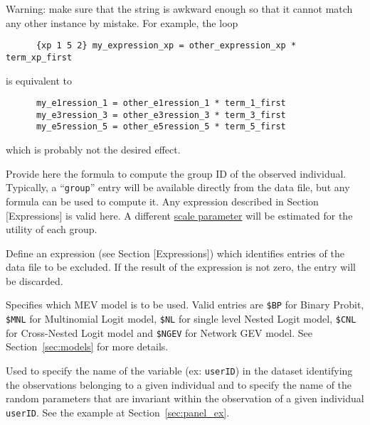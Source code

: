 \documentclass[12pt]{memoir}
\begin{document}
\begin{description}
      Warning: make sure that the string is awkward enough so that it cannot match any other instance by mistake. For example, the loop
      \small 
{\footnotesize
      \begin{verbatim}
      {xp 1 5 2} my_expression_xp = other_expression_xp * term_xp_first
      \end{verbatim}
}
      \normalsize
      is equivalent to
      \small
{\footnotesize
      \begin{verbatim}
      my_e1ression_1 = other_e1ression_1 * term_1_first
      my_e3ression_3 = other_e3ression_3 * term_3_first
      my_e5ression_5 = other_e5ression_5 * term_5_first
      \end{verbatim} 
}
      \normalsize
      which is probably not the desired effect.


   \item[\specitem{Group}]
      Provide here the formula to compute  the group ID of the  observed
      individual. Typically, a ``\verb+group+'' entry will be available directly
      from the data file, but
      any formula can be used to compute it.  Any expression
      described in Section [Expressions] is valid here. A
      different \hyperlink{Scale}{scale parameter} will be estimated for the
      utility of each group.
      
   \item[\specitem{Exclude}] Define an expression (see
      Section [Expressions]) which identifies entries of
      the data file to be excluded. If the result of the expression is not
      zero, the entry will be discarded.  

   \item[\specitem{Model}] Specifies which MEV model is to be used. Valid
      entries are \verb+$BP+ for Binary Probit, \verb+$MNL+ for Multinomial Logit model,
      \verb+$NL+ for single level Nested Logit model, 
      \verb+$CNL+ for Cross-Nested Logit model and \verb+$NGEV+ for Network GEV
      model.
      See Section~\ref{sec:models} for more details.

   \item[\specitem{PanelData}] Used to specify the name of the variable (ex: \verb+userID+) in the dataset 
      identifying the observations belonging to a given individual and to specify the 
      name of the random parameters that are invariant within the observation of a given individual 
      \verb+userID+.
See the example at Section~\ref{sec:panel_ex}.



\end{description}
\end{document}
